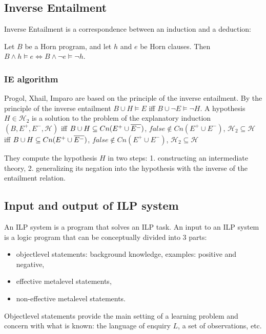 \subsection{Inverse Entailment}
Inverse Entailment is a correspondence between an induction and a deduction:
\begin{thm}\cite{kimber2012learning}
Let $B$ be a Horn program, and let $h$ and $e$ be
Horn clauses. Then $B \wedge h \models e \iff B \wedge \neg e \models \neg h$.
\end{thm}

\subsubsection{IE algorithm\cite{yamamoto2012inverse}}\label{inverse_entailement_algorithm}
Progol, Xhail, Imparo are based on the principle of the inverse entailment. By the principle of the inverse entailment $B \cup H \models E$ iff
$B \cup \neg E \models \neg H$. A hypothesis $H \in \mathcal{H}_2$ is a solution to the problem of the explanatory induction $(B,E^{+},E^{-},\mathcal{H})$ iff
$B \cup H \subseteq Cn(E^{+} \cup \overline{E^{-}})$,
 $false \not\in Cn(E^{+} \cup E^{-})$, $\mathcal{H}_2 \subseteq \mathcal{H}$
iff
$B \cup H \subseteq Cn(E^{+} \cup \overline{E^{-}})$,
 $false \not\in Cn(E^{+} \cup E^{-})$, $\mathcal{H}_2 \subseteq \mathcal{H}$
 
They compute the hypothesis $H$ in two steps:
1. constructing an intermediate theory, 2. generalizing its negation into the hypothesis with the inverse of the entailment relation.

\subsection{Input and output of ILP system}
An ILP system is a program that solves an ILP task.
An input to an ILP system is a logic program that can be conceptually divided into 3 parts:
\begin{itemize}
\item objectlevel statements: background knowledge, examples: positive and negative,
\item effective metalevel statements,
\item non-effective metalevel statements.
\end{itemize}

Objectlevel statements provide the main setting of a learning problem and concern with what is known: the language of enquiry $L$, a set of observations, etc.

